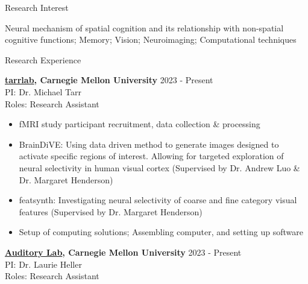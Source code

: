 \documentclass{resume} %
\begin{document}
\begin{rSection}{Research Interest}
	
	{Neural mechanism of spatial cognition and its relationship with non-spatial cognitive functions; Memory; Vision; Neuroimaging; Computational techniques}
	
\end{rSection}




\begin{rSection}{Research Experience}
	
	{\bf \href{https://sites.google.com/andrew.cmu.edu/tarrlab/}{tarrlab}, Carnegie Mellon University}
	\hfill { 2023 - Present}
	\\PI: Dr. Michael Tarr
	\\Roles: Research Assistant
	
	\begin{itemize}[nosep]
		
		\item fMRI study participant recruitment, data collection \& processing
		\item BrainDiVE: Using data driven method to generate images designed to activate specific regions of interest. Allowing for targeted exploration of neural selectivity in human visual cortex (Supervised by Dr. Andrew Luo \& Dr. Margaret Henderson)
		\item featsynth: Investigating neural selectivity of coarse and fine category visual features (Supervised by Dr. Margaret Henderson)
		\item Setup of computing solutions; Assembling computer, and setting up software
	
	\end{itemize}
	
	{\bf \href{https://www.auditorylab.org/}{Auditory Lab}, Carnegie Mellon University}
	\hfill { 2023 - Present}
	\\PI: Dr. Laurie Heller
	\\Roles: Research Assistant
	
	\begin{itemize}[nosep]
		

\end{itemize}
\end{rSection}
\end{document}
